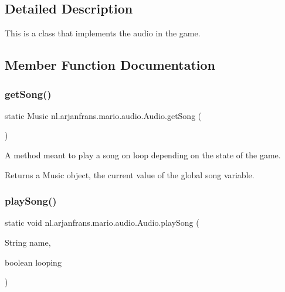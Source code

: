 \subsection{Detailed Description}
This is a class that implements the audio in the game. 

\subsection{Member Function Documentation}
\mbox{\label{classnl_1_1arjanfrans_1_1mario_1_1audio_1_1Audio_adb8068907967606c1f2cf680e04afaa3}} 
\subsubsection{\texorpdfstring{get\+Song()}{getSong()}}
{\footnotesize\ttfamily static Music nl.\+arjanfrans.\+mario.\+audio.\+Audio.\+get\+Song (\begin{DoxyParamCaption}{ }\end{DoxyParamCaption})\hspace{0.3cm}{\ttfamily [static]}}



A method meant to play a song on loop depending on the state of the game. 

\begin{DoxyReturn}{Returns}
a Music object, the current value of the global song variable. 
\end{DoxyReturn}
\mbox{\label{classnl_1_1arjanfrans_1_1mario_1_1audio_1_1Audio_aaadf4a3f91b5908a1e73c7dab8f15c00}} 
\subsubsection{\texorpdfstring{play\+Song()}{playSong()}}
{\footnotesize\ttfamily static void nl.\+arjanfrans.\+mario.\+audio.\+Audio.\+play\+Song (\begin{DoxyParamCaption}\item[{String}]{name,  }\item[{boolean}]{looping }\end{DoxyParamCaption})\hspace{0.3cm}{\ttfamily [static]}}




